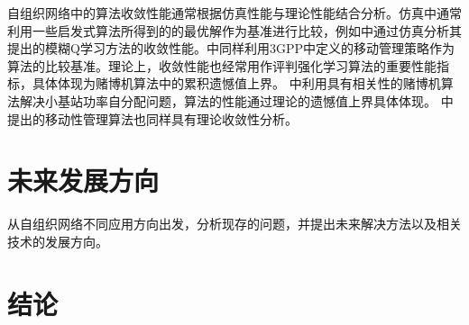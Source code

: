 ﻿\documentclass[11pt,draftclsnofoot,onecolumn,journal,letterpaper]{IEEEtran}
\begin{document}
自组织网络中的算法收敛性能通常根据仿真性能与理论性能结合分析。仿真中通常利用一些启发式算法所得到的的最优解作为基准进行比较，例如\cite{Razavi2010a}中通过仿真分析其提出的模糊Q学习方法的收敛性能。\cite{Simsek2015a}中同样利用3GPP中定义的移动管理策略作为算法的比较基准。理论上，收敛性能也经常用作评判强化学习算法的重要性能指标，具体体现为赌博机算法中的累积遗憾值上界。\cite{Wang2017} 中利用具有相关性的赌博机算法解决小基站功率自分配问题，算法的性能通过理论的遗憾值上界具体体现。\cite{Shen2016} 中提出的移动性管理算法也同样具有理论收敛性分析。

\section{未来发展方向}
\label{sec:Conclusion}
从自组织网络不同应用方向出发，分析现存的问题，并提出未来解决方法以及相关技术的发展方向。

\section{结论}





\end{document}

